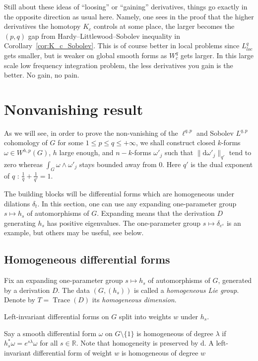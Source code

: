 \documentclass[11pt]{article}
\theoremstyle{definition}
\numberwithin{equation}{section}
\numberwithin{figure}{section}
\numberwithin{table}{section}
\DeclareMathOperator{\trace}{Trace}
\newcommand{\R}{\mathbb{R}}
\newcommand{\dd}{\mathrm{d}}
\begin{document}

Still about these ideas of ``loosing'' or ``gaining'' derivatives, things go exactly in the opposite direction as usual here. Namely, one sees in the proof that the higher derivatives the homotopy $K_c$ controls at some place, the larger becomes the $(p,q)$ gap from Hardy--Littlewood--Sobolev inequality in Corollary~\ref{cor:K_c_Sobolev}. This is of course better in local problems since $L^q_{loc}$ gets smaller, but is weaker on global smooth forms as $W_c^q$ gets larger. In this large scale low frequency integration problem, the less derivatives you gain is the better. No gain, no pain.


\section{Nonvanishing result}\label{nonvanishing}

As we will see, in order to prove the non-vanishing of the $\ell^{q,p}$ and Sobolev $L^{q,p}$ cohomology of $G$ for some $1\leq p \leq q\leq +\infty$, we shall construct closed $k$-forms $\omega\in W^{h,p}(G)$, $h$ large enough, and $n-k$-forms $\omega'_j$ such that $\|\dd\omega'_j\|_{q'}$ tend to zero whereas $\int_{G}\omega\wedge\omega'_j$ stays bounded away from $0$. Here $q'$ is the dual exponent of $q$ : $\frac{1}{q}+\frac{1}{q'}=1$.


The building blocks will be differential forms which are homogeneous under dilations $\delta_t$. In this section, one can use any expanding one-parameter group $s\mapsto h_s$ of automorphisms of $G$. Expanding means that the derivation $D$ generating $h_s$ has positive eigenvalues. The one-parameter group $s\mapsto \delta_{e^s}$ is an example, but others may be useful, see below.

\subsection{Homogeneous differential forms}\label{sec:homog-diff-forms}

Fix an expanding one-parameter group $s\mapsto h_s$ of automorphisms of $G$, generated by a derivation $D$. The data $(G,(h_s))$ is called a \emph{homogeneous Lie group}. Denote by $T=\trace(D)$ its
\emph{homogeneous dimension}.

Left-invariant differential forms on $G$ split into weights $w$ under $h_s$.

Say a smooth differential form $\omega$ on $G\setminus\{1\}$ is homogeneous of degree $\lambda$ if $h_s^*\omega=e^{s\lambda} \omega$ for all $s\in\R$. Note that homogeneity is preserved by $\dd$. A left-invariant differential form of weight $w$ is homogeneous of degree $w$
\end{document}
